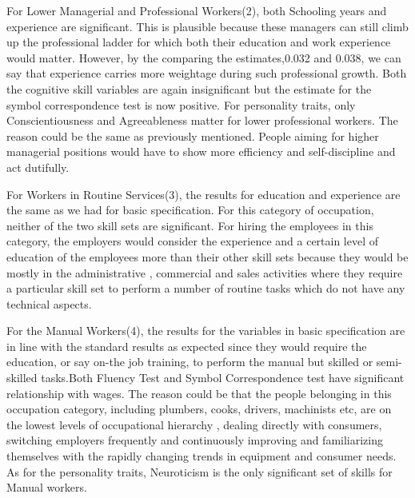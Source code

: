 \documentclass[11pt, a4paper, leqno]{article}
\begin{document}
For Lower Managerial and Professional Workers(2), both Schooling years and experience are significant. This is plausible because these managers can still climb up the professional ladder for which both their education and work experience would matter. However, by the comparing the estimates,0.032 and 0.038, we can say that experience carries more weightage during such professional growth. Both the cognitive skill variables are again insignificant but the estimate for the symbol correspondence test is now positive. For personality traits, only Conscientiousness and Agreeableness matter for lower professional workers. The reason could be the same as previously mentioned. People aiming for higher managerial positions would have to show more efficiency and self-discipline and act dutifully. \par

For Workers in Routine Services(3),  the results for education and experience are the same as we had for basic specification. For this category of occupation, neither of the two skill sets are significant. For hiring the employees in this category, the employers would consider the experience and a certain level of education of the employees more than their other skill sets because they would be mostly in the administrative , commercial and sales activities where they require a particular skill set to perform a number of  routine tasks which do not have any technical aspects.\par

For the Manual Workers(4), the results for the variables in basic specification are in line with the standard results as expected since they would require the education, or say on-the job training, to perform the manual but skilled or semi-skilled tasks.Both Fluency Test and Symbol Correspondence test have significant relationship with wages. The reason could be that the people belonging in this occupation category, including plumbers, cooks, drivers, machinists etc, are on the lowest levels of occupational hierarchy , dealing directly with consumers, switching employers frequently and continuously improving and familiarizing themselves with the rapidly changing trends in equipment and consumer needs. As for the personality traits,   Neuroticism is the  only significant set of skills for Manual workers. \par
\end{document}
